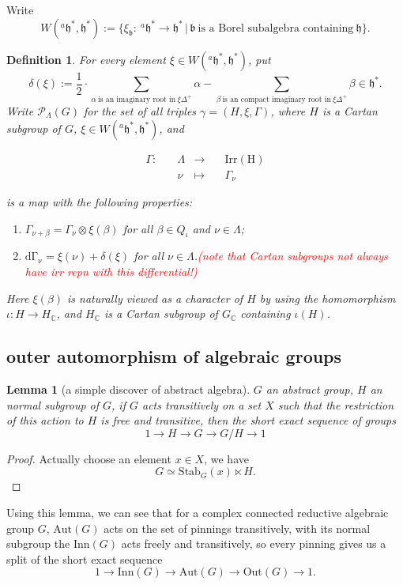 \documentclass[12pt]{amsart}
\numberwithin{equation}{section}
\newtheorem{lem}[thm]{Lemma}
\newtheorem{defn}[thm]{Definition}
\newcommand{\BC}{{\mathbb {C}}}
\newcommand{\fb}{\mathfrak{b}}
\newcommand{\fh}{\mathfrak{h}}
\newcommand{\Aut}{{\mathrm{Aut}}}
\newcommand{\Inn}{{\mathrm{Inn}}}
\newcommand{\Out}{{\mathrm{Out}}}
\newcommand{\set}[2]{\{#1\,|\,#2\}}
\newcommand{\defmap}[5]{
           \begin{equation*}
              \begin{aligned}
                   #1:\quad  & #2 &\longrightarrow &\quad #3 \\
                      \quad  & #4    &\longmapsto  &\quad #5
              \end{aligned}
           \end{equation*}
          }
\newcommand{\shortexact}[5]{#1\rightarrow #2 \rightarrow #3 \rightarrow #4\rightarrow #5}
\begin{document}
Write $$W(^{a}\fh^*,\fh^*) :=  \set{\xi_{\fb}: \ ^{a}\fh^* \to \fh^*}{\fb \ \textrm{is a Borel subalgebra containing} \ \fh}.$$

\begin{defn}
  For every element $\xi \in W(^{a}\fh^*,\fh^*)$, put
  $$\delta(\xi) := \frac{1}{2} \cdot \sum\limits_{\alpha  \ \textrm{is an imaginary root in} \ \xi\Delta^+}\alpha - \sum\limits_{\beta \ \textrm{is an compact imaginary root in} \ \xi\Delta^+}\beta \in \fh^* .$$
  Write $\mathcal{P} _{\Lambda}(G)$ for the set of all triples $\gamma = (H,\xi,\Gamma)$, where
  $H$ is a Cartan subgroup of $G$, $\xi \in W(^{a}\fh^*,\fh^*)$, and
  \defmap{\Gamma}{\Lambda}{\mathrm{Irr(H)}}{\nu}{\Gamma_{\nu}}
  is a map with the following properties:
  \begin{enumerate}
    \item $\Gamma_{\nu+\beta} = \Gamma_{\nu} \otimes \xi(\beta)$ for all $\beta \in Q_{\iota}$ and $\nu \in \Lambda$;
    \item $\mathrm{d\Gamma_{\nu}} = \xi(\nu) + \delta(\xi)$ for all $\nu \in \Lambda$.\textcolor{red}{(note that Cartan subgroups not always have irr repn with this differential!)}
  \end{enumerate}
  Here $\xi(\beta)$ is naturally viewed as a character of $H$ by using the homomorphism
  $\iota : H \to H_{\BC}$, and $H_{\BC}$ is a Cartan subgroup of $G_{\BC}$ containing $\iota(H)$.
\end{defn}

\newpage

\subsection{outer automorphism of algebraic groups}

\begin{lem}[a simple discover of abstract algebra]
  $G$ an abstract group, $H$ an normal subgroup of $G$, if $G$ acts
  transitively on a set $X$ such that the restriction of this action
  to $H$ is free and transitive, then the short exact sequence of groups
  $$\shortexact{1}{H}{G}{G/H}{1}$$
\end{lem}

\begin{proof}
  Actually choose an element $x \in X$, we have
  $$ G \simeq \mathrm{Stab}_{G}(x) \ltimes H.$$
\end{proof}


Using this lemma, we can see that for a complex connected reductive
algebraic group $G$, $\Aut(G)$ acts on the set of pinnings transitively,
with its normal subgroup the $\Inn(G)$ acts freely and transitively,
so every pinning gives us a split of the short exact sequence
$$\shortexact{1}{\Inn(G)}{\Aut(G)}{\Out(G)}{1}.$$
\end{document}
